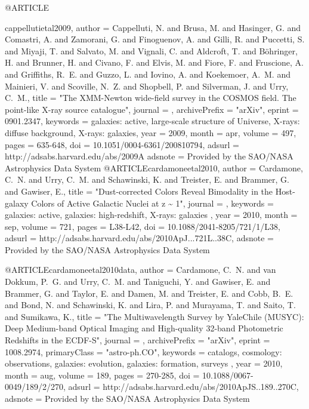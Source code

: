 {{{{{{{{{{{{@ARTICLE{cappellutietal2009,
   author = {{Cappelluti}, N. and {Brusa}, M. and {Hasinger}, G. and {Comastri}, A. and 
	{Zamorani}, G. and {Finoguenov}, A. and {Gilli}, R. and {Puccetti}, S. and 
	{Miyaji}, T. and {Salvato}, M. and {Vignali}, C. and {Aldcroft}, T. and 
	{B{\"o}hringer}, H. and {Brunner}, H. and {Civano}, F. and {Elvis}, M. and 
	{Fiore}, F. and {Fruscione}, A. and {Griffiths}, R.~E. and {Guzzo}, L. and 
	{Iovino}, A. and {Koekemoer}, A.~M. and {Mainieri}, V. and {Scoville}, N.~Z. and 
	{Shopbell}, P. and {Silverman}, J. and {Urry}, C.~M.},
    title = "{The XMM-Newton wide-field survey in the COSMOS field. The point-like X-ray source catalogue}",
  journal = {\aap},
archivePrefix = "arXiv",
   eprint = {0901.2347},
 keywords = {galaxies: active, large-scale structure of Universe, X-rays: diffuse background, X-rays: galaxies},
     year = 2009,
    month = apr,
   volume = 497,
    pages = {635-648},
      doi = {10.1051/0004-6361/200810794},
   adsurl = {http://adsabs.harvard.edu/abs/2009A%
  adsnote = {Provided by the SAO/NASA Astrophysics Data System}
}
@ARTICLE{cardamoneetal2010,
   author = {{Cardamone}, C.~N. and {Urry}, C.~M. and {Schawinski}, K. and 
	{Treister}, E. and {Brammer}, G. and {Gawiser}, E.},
    title = "{Dust-corrected Colors Reveal Bimodality in the Host-galaxy Colors of Active Galactic Nuclei at z \~{} 1}",
  journal = {\apjl},
 keywords = {galaxies: active, galaxies: high-redshift, X-rays: galaxies },
     year = 2010,
    month = sep,
   volume = 721,
    pages = {L38-L42},
      doi = {10.1088/2041-8205/721/1/L38},
   adsurl = {http://adsabs.harvard.edu/abs/2010ApJ...721L..38C},
  adsnote = {Provided by the SAO/NASA Astrophysics Data System}
}

@ARTICLE{cardamoneetal2010data,
   author = {{Cardamone}, C.~N. and {van Dokkum}, P.~G. and {Urry}, C.~M. and 
	{Taniguchi}, Y. and {Gawiser}, E. and {Brammer}, G. and {Taylor}, E. and 
	{Damen}, M. and {Treister}, E. and {Cobb}, B.~E. and {Bond}, N. and 
	{Schawinski}, K. and {Lira}, P. and {Murayama}, T. and {Saito}, T. and 
	{Sumikawa}, K.},
    title = "{The Multiwavelength Survey by Yale{\ndash}Chile (MUSYC): Deep Medium-band Optical Imaging and High-quality 32-band Photometric Redshifts in the ECDF-S}",
  journal = {\apjs},
archivePrefix = "arXiv",
   eprint = {1008.2974},
 primaryClass = "astro-ph.CO",
 keywords = {catalogs, cosmology: observations, galaxies: evolution, galaxies: formation, surveys },
     year = 2010,
    month = aug,
   volume = 189,
    pages = {270-285},
      doi = {10.1088/0067-0049/189/2/270},
   adsurl = {http://adsabs.harvard.edu/abs/2010ApJS..189..270C},
  adsnote = {Provided by the SAO/NASA Astrophysics Data System}
}


}}}}}}}}}}}}}

